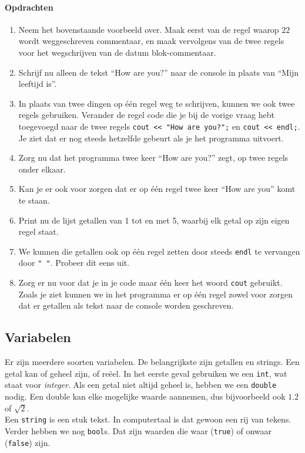 \documentclass[12pt,a4paper]{article}
\newcommand{\icode}{\lstinline}
\begin{document}
\paragraph{Opdrachten}
\begin{enumerate}
		\item
			Neem het bovenstaande voorbeeld over. Maak eerst van de regel waarop $22$ wordt weggeschreven commentaar, en maak vervolgens van de twee regels voor het wegschrijven van de datum blok-commentaar.
		\item
			Schrijf nu alleen de tekst ``How are you?'' naar de console in plaats van ``Mijn leeftijd is''.
		\item
			In plaats van twee dingen op \'e\'en regel weg te schrijven, kunnen we ook twee regels gebruiken. Verander de regel code die je bij de vorige vraag hebt toegevoegd naar de twee regels \icode{cout << "How are you?";} en \icode{cout << endl;}. Je ziet dat er nog steeds hetzelfde gebeurt als je het programma uitvoert.
		\item
			Zorg nu dat het programma twee keer ``How are you?'' zegt, op twee regels onder elkaar.
		\item
			Kan je er ook voor zorgen dat er op \'e\'en regel twee keer ``How are you'' komt te staan.
		\item
			Print nu de lijst getallen van 1 tot en met 5, waarbij elk getal op zijn eigen regel staat.
		\item
			We kunnen die getallen ook op \'e\'en regel zetten door steeds \icode{endl} te vervangen door \icode{" "}. Probeer dit eens uit.
		\item
			Zorg er nu voor dat je in je code maar \'e\'en keer het woord \icode{cout} gebruikt.
			Zoals je ziet kunnen we in het programma er op \'e\'en regel zowel voor zorgen dat er getallen als tekst naar de console worden geschreven. 
\end{enumerate}

\subsection{Variabelen}
Er zijn meerdere soorten variabelen. De belangrijkste zijn getallen en strings. Een getal kan of geheel zijn, of re\"eel. In het eerste geval gebruiken we een \icode{int}, wat staat voor \emph{integer}. Als een getal niet altijd geheel is, hebben we een \icode{double} nodig. Een double kan elke mogelijke waarde aannemen, dus bijvoorbeeld ook $1.2$ of $\sqrt 2$.\\
Een \icode{string} is een stuk tekst. In computertaal is dat gewoon een rij van tekens. Verder hebben we nog \icode{bool}s. Dat zijn waarden die waar (\icode{true}) of onwaar (\icode{false}) zijn.
\end{document}
